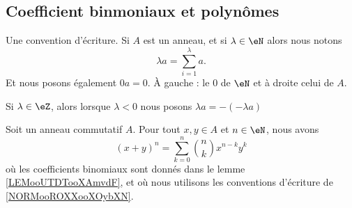 \subsection{Coefficient binmoniaux et polynômes}

\begin{normaltext}		\label{NORMooROXXooXOybXN}
	Une convention d'écriture. Si \( A\) est un anneau, et si \( \lambda\in \eN\) alors nous notons
	\begin{equation}
		\lambda a=\sum_{i=1}^{\lambda}a.
	\end{equation}
	Et nous posons également \( 0a=0\). À gauche : le \( 0\) de \( \eN\) et à droite celui de \( A\).

	Si \( \lambda\in \eZ\), alors lorsque \( \lambda<0\) nous posons \( \lambda a=  -(-\lambda a)  \)
\end{normaltext}


\begin{proposition}     \label{PropBinomFExOiL}
	Soit un anneau commutatif \( A\). Pour tout \( x,y\in A\) et \( n\in \eN\), nous avons
	\begin{equation}        \label{EqNewtonB}
		(x+y)^n=\sum_{k=0}^n{n\choose k}x^{n-k}y^k
	\end{equation}
	où les coefficients binomiaux sont donnés dans le lemme \ref{LEMooUTDTooXAmvdF}, et où nous utilisons les conventions d'écriture de \ref{NORMooROXXooXOybXN}.
\end{proposition}

